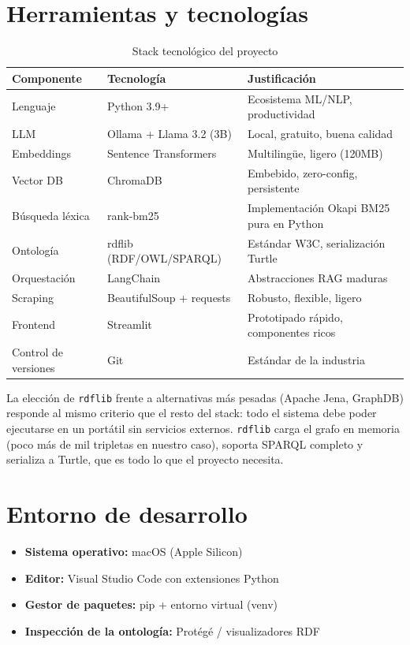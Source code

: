 \documentclass[12pt, a4paper, twoside]{report}
\begin{document}
\section{Herramientas y tecnolog\'ias}

\begin{table}[H]
\centering
\caption{Stack tecnol\'ogico del proyecto}
\label{tab:stack}
\begin{tabularx}{\textwidth}{llX}
\toprule
\textbf{Componente} & \textbf{Tecnolog\'ia} & \textbf{Justificaci\'on} \\
\midrule
Lenguaje & Python 3.9+ & Ecosistema ML/NLP, productividad \\
LLM & Ollama + Llama 3.2 (3B) & Local, gratuito, buena calidad \\
Embeddings & Sentence Transformers & Multiling\"ue, ligero (120MB) \\
Vector DB & ChromaDB & Embebido, zero-config, persistente \\
B\'usqueda l\'exica & rank-bm25 & Implementaci\'on Okapi BM25 pura en Python \\
Ontolog\'ia & rdflib (RDF/OWL/SPARQL) & Est\'andar W3C, serializaci\'on Turtle \\
Orquestaci\'on & LangChain & Abstracciones RAG maduras \\
Scraping & BeautifulSoup + requests & Robusto, flexible, ligero \\
Frontend & Streamlit & Prototipado r\'apido, componentes ricos \\
Control de versiones & Git & Est\'andar de la industria \\
\bottomrule
\end{tabularx}
\end{table}

La elecci\'on de \texttt{rdflib} frente a alternativas m\'as pesadas (Apache Jena, GraphDB) responde al mismo criterio que el resto del stack: todo el sistema debe poder ejecutarse en un port\'atil sin servicios externos. \texttt{rdflib} carga el grafo en memoria (poco m\'as de mil tripletas en nuestro caso), soporta SPARQL completo y serializa a Turtle, que es todo lo que el proyecto necesita.

\section{Entorno de desarrollo}

\begin{itemize}
  \item \textbf{Sistema operativo:} macOS (Apple Silicon)
  \item \textbf{Editor:} Visual Studio Code con extensiones Python
  \item \textbf{Gestor de paquetes:} pip + entorno virtual (venv)
  \item \textbf{Inspecci\'on de la ontolog\'ia:} Prot\'eg\'e / visualizadores RDF
\end{itemize}
\end{document}

